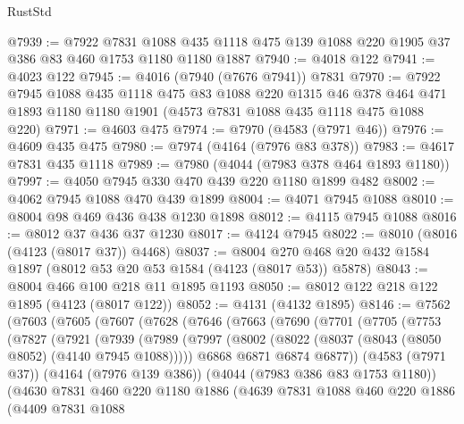 \begin{lexlean}{RustStd}
\begin{coremodule}
@7939 := @7922
    @7831
    @1088
    @435
    @1118
    @475
    @139
    @1088
    @220
    @1905
    @37
    @386
    @83
    @460
    @1753
    @1180
    @1180
    @1887
@7940 := @4018 @122
@7941 := @4023 @122
@7945 := @4016 (@7940 (@7676 @7941)) @7831
@7970 := @7922
    @7945
    @1088
    @435
    @1118
    @475
    @83
    @1088
    @220
    @1315
    @46
    @378
    @464
    @471
    @1893
    @1180
    @1180
    @1901
    (@4573 @7831 @1088 @435 @1118 @475 @1088 @220)
@7971 := @4603 @475
@7974 := @7970 (@4583 (@7971 @46))
@7976 := @4609 @435 @475
@7980 := @7974 (@4164 (@7976 @83 @378))
@7983 := @4617 @7831 @435 @1118
@7989 := @7980 (@4044 (@7983 @378 @464 @1893 @1180))
@7997 := @4050 @7945 @330 @470 @439 @220 @1180 @1899 @482
@8002 := @4062 @7945 @1088 @470 @439 @1899
@8004 := @4071 @7945 @1088
@8010 := @8004 @98 @469 @436 @438 @1230 @1898
@8012 := @4115 @7945 @1088
@8016 := @8012 @37 @436 @37 @1230
@8017 := @4124 @7945
@8022 := @8010 (@8016 (@4123 (@8017 @37)) @4468)
@8037 := @8004 @270 @468 @20 @432 @1584 @1897 (@8012 @53 @20 @53 @1584 (@4123 (@8017 @53)) @5878)
@8043 := @8004 @466 @100 @218 @11 @1895 @1193
@8050 := @8012 @122 @218 @122 @1895 (@4123 (@8017 @122))
@8052 := @4131 (@4132 @1895)
@8146 := @7562
    (@7603
      (@7605
        (@7607
          (@7628
            (@7646
              (@7663
                (@7690
                  (@7701
                    (@7705
                      (@7753
                        (@7827
                          (@7921
                            (@7939
                              (@7989
                                (@7997
                                  (@8002 (@8022 (@8037 (@8043 (@8050 @8052) (@4140 @7945 @1088)))))
                                  @6868
                                  @6871
                                  @6874
                                  @6877))
                              (@4583 (@7971 @37))
                              (@4164 (@7976 @139 @386))
                              (@4044 (@7983 @386 @83 @1753 @1180))
                              (@4630
                                @7831
                                @460
                                @220
                                @1180
                                @1886
                                (@4639
                                  @7831
                                  @1088
                                  @460
                                  @220
                                  @1886
                                  (@4409
                                    @7831
                                    @1088

\end{coremodule}
\end{lexlean}
